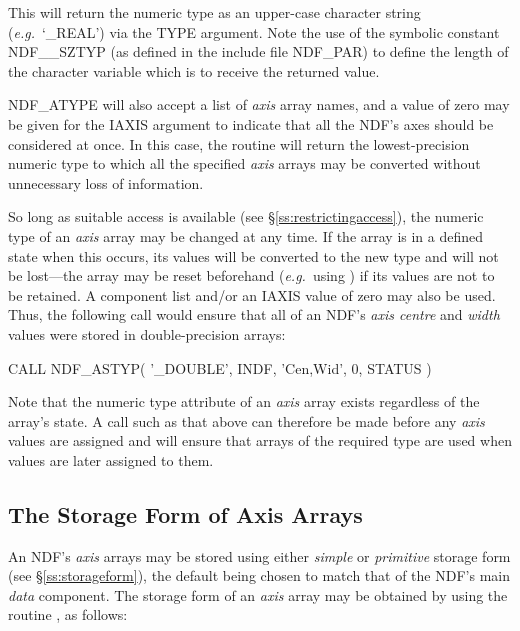 \documentclass[twoside,11pt,nolof]{starlink}
\providecommand{\st}[1]{{\emph{#1}}}
\begin{document}
This will return the numeric type as an upper-case character string
(\st{e.g.}\ `\_REAL') via the TYPE argument.
Note the use of the symbolic constant NDF\_\_SZTYP (as defined in the
include file NDF\_PAR) to define the length of the character variable which
is to receive the returned value.

NDF\_ATYPE will also accept a list of \st{axis\/} array names, and a value
of zero may be given for the IAXIS argument to indicate that all the NDF's
axes should be considered at once.
In this case, the routine will return the lowest-precision numeric type to
which all the specified \st{axis\/} arrays may be converted without
unnecessary loss of information.

So long as suitable access is available (see \S\ref{ss:restrictingaccess}),
the numeric type of an \st{axis\/} array may be changed at any time.
If the array is in a defined state when this occurs, its values will be
converted to the new type and will not be lost---the array may be reset
beforehand (\st{e.g.}\ using ) if its values are not to be
retained.
A component list and/or an IAXIS value of zero may also be used.
Thus, the following call would ensure that all of an NDF's \st{axis
centre\/} and \st{width\/} values were stored in double-precision
arrays:

\small
\begin{terminalv}
      CALL NDF_ASTYP( '_DOUBLE', INDF, 'Cen,Wid', 0, STATUS )
\end{terminalv}
\normalsize

Note that the numeric type attribute of an \st{axis\/} array exists
regardless of the array's state.
A call such as that above can therefore be made before any \st{axis\/}
values are assigned and will ensure that arrays of the required type are
used when values are later assigned to them.

\subsection{The Storage Form of Axis Arrays}

An NDF's \st{axis\/} arrays may be stored using either \st{simple\/} or
\st{primitive\/} storage form (see \S\ref{ss:storageform}), the default
being chosen to match that of the NDF's main \st{data\/} component.
The storage form of an \st{axis\/} array may be obtained by using the
routine , as follows:
\end{document}
